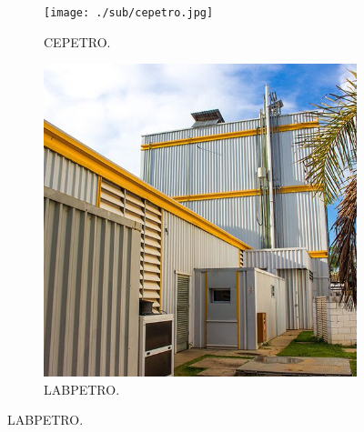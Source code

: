   \begin{figure}[!htb]
    \begin{subfigure}{0.48\textwidth}
      \texttt{[image: ./sub/cepetro.jpg]}
      \caption{CEPETRO.} 
      \label{fig:CEPETRO}
    \end{subfigure}
    \hspace*{\fill} %
    \begin{subfigure}{0.48\textwidth}
      \includegraphics[width=\linewidth, height=0.6\textheight, keepaspectratio=True]{./sub/labpetro.jpg}
      \caption{LABPETRO.}
      \label{fig:LABPETRO}
    \end{subfigure}
  \end{figure}
